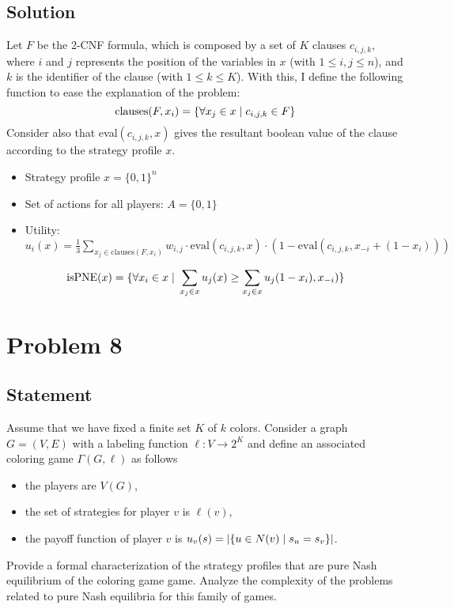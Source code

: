\documentclass[a4paper, 10pt]{article}
\newcommand{\suchthat}[0]{\hspace{1mm}|\hspace{1mm}}
\begin{document}
\subsection*{Solution}
Let $F$ be the 2-CNF formula, which is composed by a set of $K$ clauses $c_{i,j,k}$, where $i$ and $j$ represents the position of the variables in $x$ (with $1 \leq i,j \leq n$), and $k$ is the identifier of the clause (with $1 \leq k \leq K$). With this, I define the following function to ease the explanation of the problem: 
\[\text{clauses}(F,x_i) = \{\forall x_j \in x \suchthat c_{i,j,k} \in F\}\]
Consider also that eval$(c_{i,j,k},x)$ gives the resultant boolean value of the clause according to the strategy profile $x$.  
\begin{itemize}
    \item Strategy profile $x = \{0,1\}^n$
    \item Set of actions for all players: $A = \{0,1\}$
    \item Utility: $u_i(x) = \frac{1}{3}\sum_{x_j \in \text{clauses}(F,x_i)} w_{i,j}\cdot \text{eval}(c_{i,j,k},x) \cdot (1-\text{eval}(c_{i,j,k},x_{-i}+(1-x_i)))$
\end{itemize}
$$\text{isPNE}(x) = \{\forall x_i \in x \suchthat \sum_{x_j\in x}u_j(x)\geq \sum_{x_j\in x}u_j(1-x_i),x_{-i}) \}$$

\section*{Problem 8}
{\color{statement} 
\subsection*{Statement}
Assume that we have fixed a finite set $K$ of $k$ colors. Consider a graph $G = (V, E)$ with a labeling function $\ell: V \rightarrow 2^K$ and define an associated coloring game $\Gamma(G, \ell)$ as follows
\begin{itemize}
    \item the players are $V(G)$,
    \item the set of strategies for player $v$ is $\ell(v)$,
    \item the payoff function of player $v$ is $u_v(s) = |\{u \in N(v) \suchthat s_u = s_v \}|$.
\end{itemize}

Provide a formal characterization of the strategy profiles that are pure Nash equilibrium of the coloring game game. Analyze the complexity of the problems related to pure Nash equilibria for this family of games.}
\end{document}
